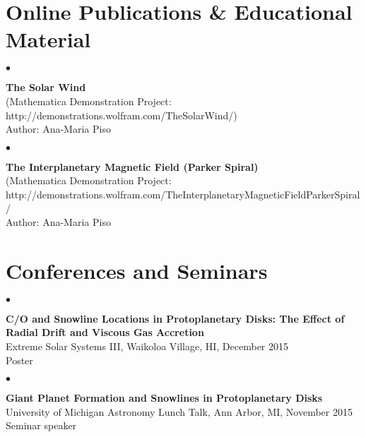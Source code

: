 \documentclass[margin,line]{res}
\newenvironment{list2}{
  \begin{list}{$\bullet$}{%
      \setlength{\itemsep}{0in}
      \setlength{\parsep}{0in} \setlength{\parskip}{0in}
      \setlength{\topsep}{0in} \setlength{\partopsep}{0in} 
      \setlength{\leftmargin}{0.2in}}}{\end{list}}
\begin{document}
\begin{resume}

\section{\sc Online Publications \& Educational Material}

\begin{list2}
\item[] {\bf The Solar Wind} \\
(Mathematica Demonstration Project: http://demonstrations.wolfram.com/TheSolarWind/) \\
Author: Ana-Maria Piso \\
\end{list2}

\vspace*{-.13in}
\begin{list2}
\item[] {\bf The Interplanetary Magnetic Field (Parker Spiral)} \\
(Mathematica Demonstration Project: \\
http://demonstrations.wolfram.com/TheInterplanetaryMagneticFieldParkerSpiral/ \\
Author: Ana-Maria Piso \\
\end{list2}


\section{\sc Conferences and Seminars}

\begin{list2}
\item[] {\bf C/O and Snowline Locations in Protoplanetary Disks: The Effect of Radial Drift and Viscous Gas Accretion} \\
Extreme Solar Systems III, Waikoloa Village, HI, December 2015 \\
Poster \\
\end{list2}

\begin{list2}
\item[] {\bf Giant Planet Formation and Snowlines in Protoplanetary Disks} \\
University of Michigan Astronomy Lunch Talk, Ann Arbor, MI, November 2015 \\
Seminar speaker \\
\end{list2}


\end{resume}
\end{document}
